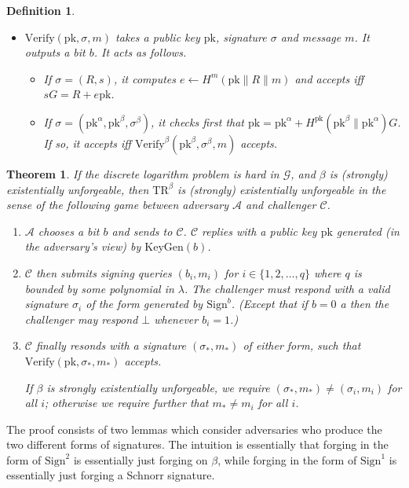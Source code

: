 \documentclass[letterpaper]{article}
\newtheorem{thrm}{Theorem}
\newtheorem{defn}{Definition}
\newcommand{\TR}[1]{\mathrm{TR}^{#1}}
\newcommand{\KeyGen}{\mathrm{KeyGen}}
\newcommand{\Sign}{\mathrm{Sign}}
\newcommand{\Verify}{\mathrm{Verify}}
\newcommand{\pk}{\mathrm{pk}}
\begin{document}
\begin{defn}
\begin{itemize}
\item $\Verify(\pk, \sigma, m)$ takes a public key $\pk$, signature $\sigma$ and
message $m$. It outputs a bit $b$. It acts as follows.

\begin{itemize}
\item If $\sigma = (R, s)$, it computes $e\gets H^m(\pk\|R\|m)$ and accepts
iff $sG = R + e\pk$.

\item If $\sigma = (\pk^\alpha, \pk^\beta, \sigma^\beta)$, it checks first that
$\pk = \pk^\alpha + H^\pk(\pk^\beta\|\pk^\alpha)G$. If so, it accepts iff
$\Verify^\beta(\pk^\beta, \sigma^\beta, m)$ accepts.
\end{itemize}

\end{itemize}

\end{defn}

\begin{thrm} If the discrete logarithm problem is hard in $\mathcal{G}$, and
$\beta$ is (strongly) existentially unforgeable, then $\TR\beta$ is (strongly)
existentially unforgeable in the sense of the following game between adversary
$\mathcal{A}$ and challenger $\mathcal{C}$.

\begin{enumerate}
\item $\mathcal{A}$ chooses a bit $b$ and sends to $\mathcal{C}$.
$\mathcal{C}$ replies with a public key $\pk$ generated (in the adversary's
view) by $\KeyGen(b)$.
\item $\mathcal{C}$ then submits signing queries $(b_i, m_i)$ for $i\in\{1,2,\ldots,q\}$
where $q$ is bounded by some polynomial in $\lambda$. The challenger must respond
with a valid signature $\sigma_i$ of the form generated by $\Sign^b$. (Except that
if $b=0$ a then the challenger may respond $\bot$ whenever $b_i=1$.)
\item $\mathcal{C}$ finally resonds with a signature $(\sigma_*, m_*)$ of either
form, such that $\Verify(\pk, \sigma_*, m_*)$ accepts.

If $\beta$ is strongly existentially unforgeable, we require $(\sigma_*, m_*)\neq
(\sigma_i, m_i)$ for all $i$; otherwise we require further that $m_*\neq m_i$ for
all $i$.
\end{enumerate}
\end{thrm}

The proof consists of two lemmas which consider adversaries who produce the
two different forms of signatures. The intuition is essentially that forging
in the form of $\Sign^2$ is essentially just forging on $\beta$, while
forging in the form of $\Sign^1$ is essentially just forging a Schnorr signature.
\end{document}
